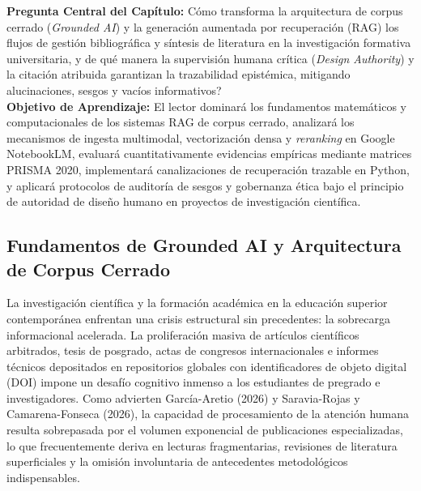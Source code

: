 \begin{cajabeige}
\textbf{Pregunta Central del Capítulo:} \textquestiondown Cómo transforma la arquitectura de corpus cerrado (\textit{Grounded AI}) y la generación aumentada por recuperación (RAG) los flujos de gestión bibliográfica y síntesis de literatura en la investigación formativa universitaria, y de qué manera la supervisión humana crítica (\textit{Design Authority}) y la citación atribuida garantizan la trazabilidad epistémica, mitigando alucinaciones, sesgos y vacíos informativos?\\[0.3cm]
\textbf{Objetivo de Aprendizaje:} El lector dominará los fundamentos matemáticos y computacionales de los sistemas RAG de corpus cerrado, analizará los mecanismos de ingesta multimodal, vectorización densa y \textit{reranking} en Google NotebookLM, evaluará cuantitativamente evidencias empíricas mediante matrices PRISMA 2020, implementará canalizaciones de recuperación trazable en Python, y aplicará protocolos de auditoría de sesgos y gobernanza ética bajo el principio de autoridad de diseño humano en proyectos de investigación científica.
\end{cajabeige}


\vspace{0.4cm}

\subsection{Fundamentos de Grounded AI y Arquitectura de Corpus Cerrado}

La investigación científica y la formación académica en la educación superior contemporánea enfrentan una crisis estructural sin precedentes: la sobrecarga informacional acelerada. La proliferación masiva de artículos científicos arbitrados, tesis de posgrado, actas de congresos internacionales e informes técnicos depositados en repositorios globales con identificadores de objeto digital (DOI) impone un desafío cognitivo inmenso a los estudiantes de pregrado e investigadores. Como advierten García-Aretio (2026) y Saravia-Rojas y Camarena-Fonseca (2026), la capacidad de procesamiento de la atención humana resulta sobrepasada por el volumen exponencial de publicaciones especializadas, lo que frecuentemente deriva en lecturas fragmentarias, revisiones de literatura superficiales y la omisión involuntaria de antecedentes metodológicos indispensables.

